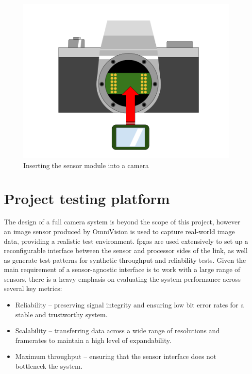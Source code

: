 \begin{figure}
  \centering
  \includegraphics[width=1\textwidth]{./img/sensor_module.png}
  \caption{Inserting the sensor module into a camera}
  \label{fig:sensor_module}
\end{figure}



\section{Project testing platform}

The design of a full camera system is beyond the scope of this project, however an image sensor produced by OmniVision is used to capture real-world image data, providing a realistic test environment. \Glspl{fpga} are used extensively to set up a reconfigurable interface between the sensor and processor sides of the link, as well as generate test patterns for synthetic throughput and reliability tests. Given the main requirement of a sensor-agnostic interface is to work with a large range of sensors, there is a heavy emphasis on evaluating the system performance across several key metrics:

\begin{itemize}
  \item Reliability -- preserving signal integrity and ensuring low bit error rates for a stable and trustworthy system.
  \item Scalability -- transferring data across a wide range of resolutions and framerates to maintain a high level of expandability.
  \item Maximum throughput -- ensuring that the sensor interface does not bottleneck the system.
\end{itemize}

